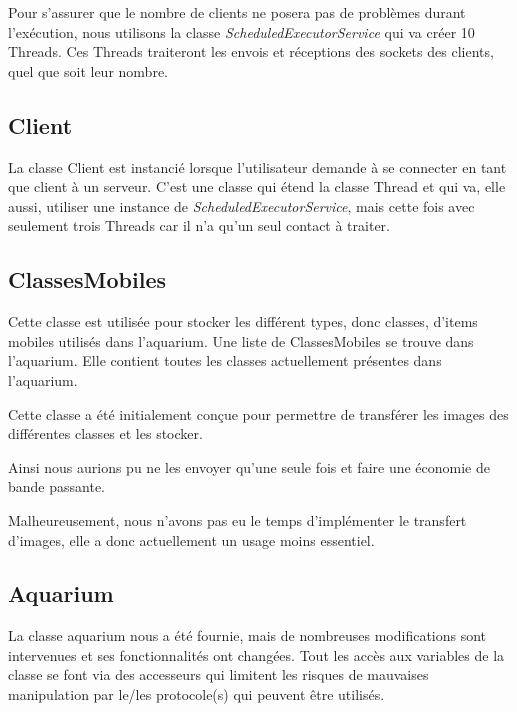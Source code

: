 \documentclass[a4paper, 12pt]{report}
\begin{document}
\begin{spacing}{1.3}
Pour s'assurer que le nombre de clients ne posera pas de problèmes durant l'exécution, nous utilisons la classe \textit{ScheduledExecutorService} qui va créer 10 Threads. Ces Threads traiteront les envois et réceptions des sockets des clients, quel que soit leur nombre.
	
\textcolor{colortitre3}{\subsection*{Client}}

La classe Client est instancié lorsque l'utilisateur demande à se connecter en tant que client à un serveur. C'est une classe qui étend la classe Thread et qui va, elle aussi, utiliser une instance de \textit{ScheduledExecutorService}, mais cette fois avec seulement trois Threads car il n'a qu'un seul contact à traiter.
		
\textcolor{colortitre3}{\subsection*{ClassesMobiles}}
		
Cette classe est utilisée pour stocker les différent types, donc classes, d'items mobiles utilisés dans l'aquarium. Une liste de ClassesMobiles se trouve dans l'aquarium. Elle contient toutes les classes actuellement présentes dans l'aquarium.

Cette classe a été initialement conçue pour permettre de transférer les images des différentes classes et les stocker.

Ainsi nous aurions pu ne les envoyer qu'une seule fois et faire une économie de bande passante.

Malheureusement, nous n'avons pas eu le temps d'implémenter le transfert d'images, elle a donc actuellement un usage moins essentiel.

\textcolor{colortitre3}{\subsection*{Aquarium}}
		
La classe aquarium nous a été fournie, mais de nombreuses modifications sont intervenues et ses fonctionnalités ont changées.
Tout les accès aux variables de la classe se font via des accesseurs qui limitent les risques de mauvaises manipulation par le/les protocole(s) qui peuvent être utilisés.
	

\end{spacing}
\end{document}
